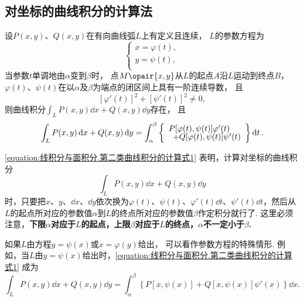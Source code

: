 \subsection{对坐标的曲线积分的计算法}
\begin{theorem}
设\(P(x,y)\)、\(Q(x,y)\)在有向曲线弧\(L\)上有定义且连续，%
\(L\)的参数方程为\[
\left\{ \begin{array}{l}
x = \varphi(t), \\
y = \psi(t), \\
\end{array} \right.
\]当参数\(t\)单调地由\(\alpha\)变到\(\beta\)时，%
点\(M\opair{x,y}\)从\(L\)的起点\(A\)沿\(L\)运动到终点\(B\)，%
\(\varphi(t)\)、\(\psi(t)\)在以\(\alpha\)及\(\beta\)为端点的闭区间上具有一阶连续导数，%
且\[
[\varphi'(t)]^2+[\psi'(t)]^2 \neq 0,
\]则曲线积分\(\int_L{P(x,y)\dd{x} + Q(x,y)\dd{y}}\)存在，%
且\begin{equation}\label{equation:线积分与面积分.第二类曲线积分的计算式1}
\int_L P(x,y) \dd{x} + Q(x,y) \dd{y}
= \int_{\alpha}^{\beta} \left\{ \def\arraystretch{.7}\begin{array}{l}
P[\varphi(t),\psi(t)] \varphi'(t) \\
\hspace{5pt}+ Q[\varphi(t),\psi(t)] \psi'(t)
\end{array} \right\} \dd{t}.
\end{equation}
\end{theorem}
\cref{equation:线积分与面积分.第二类曲线积分的计算式1} 表明，计算对坐标的曲线积分\[
\int_L P(x,y) \dd{x} + Q(x,y) \dd{y}
\]时，只要把\(x\)、\(y\)、\(\dd{x}\)、\(\dd{y}\)依次换为\(\varphi(t)\)、\(\psi(t)\)、\(\varphi'(t) \dd{t}\)、\(\psi'(t) \dd{t}\)，然后从\(L\)的起点所对应的参数值\(\alpha\)到\(L\)的终点所对应的参数值\(\beta\)作定积分就行了.
这里必须注意，\textbf{下限\(\alpha\)对应于\(L\)的起点，上限\(\beta\)对应于\(L\)的终点，\(\alpha\)不一定小于\(\beta\).}

如果\(L\)由方程\(y = \psi(x)\)或\(x = \varphi(y)\)给出，%
可以看作参数方程的特殊情形.
例如，当\(L\)由\(y = \psi(x)\)给出时，\cref{equation:线积分与面积分.第二类曲线积分的计算式1} 成为\[
\int_L P(x,y) \dd{x} + Q(x,y) \dd{y}
= \int_{\alpha}^{\beta} \left\{
	P[x,\psi(x)] + Q[x,\psi(x)] \psi'(x)
\right\} \dd{x}.
\]

